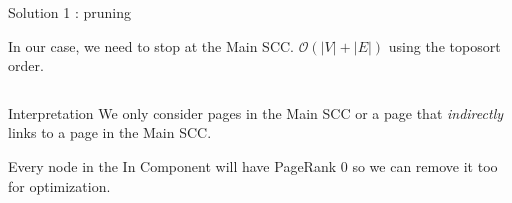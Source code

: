 \documentclass[10pt]{beamer}
\newcommand\bigoh{\mathcal{O}}
\begin{document}
\begin{frame}[allowframebreaks]{Solution 1 : pruning}
\begin{center}
  \end{center}
  In our case, we need to stop at the Main SCC.
  $\bigoh(|V| + |E|)$ using the toposort order.

  \framebreak

  \begin{columns}
    \begin{column}{0.5\textwidth}
      \begin{block}{Interpretation}
        We only consider pages in the Main SCC or a page that \emph{indirectly} links to a page in the Main SCC.
      \end{block}
      Every node in the In Component will have PageRank 0 so we can remove it too for optimization.


\end{column}
\end{columns}
\end{frame}
\end{document}
